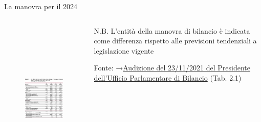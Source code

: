 \documentclass[aspectratio=64,11pt]{beamer}
\begin{document}
\begin{frame}{La manovra per il 2024}

  \begin{columns}
    \begin{column}{.75\columnwidth}
      \vspace{-3mm}
      \begin{figure}
        \centering
        \includegraphics[height=7.5cm]{./figure/audizione-UPB-DDL-bilancio-2024-tab-3-1.png}
      \end{figure}
    \end{column}

    \begin{column}{.25\columnwidth}
      \footnotesize N.B. L'entità della manovra di bilancio è indicata come
      differenza rispetto alle previsioni tendenziali \alert{a legislazione
        vigente}
      
      \vspace{5mm}

      \tiny Fonte: →\href{https://www.upbilancio.it/wp-content/uploads/2021/11/Audizione-UPB-DDL-bilancio-2022.pdf}{Audizione del 23/11/2021 del Presidente dell'Ufficio Parlamentare di Bilancio} (Tab. 2.1)
    \end{column}
  \end{columns}
\end{frame}
\end{document}
